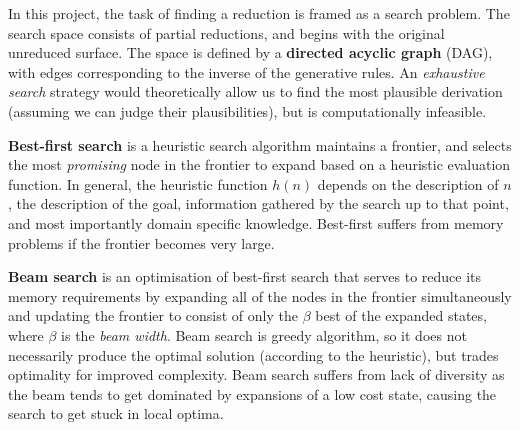 \documentclass[12pt,a4paper,twoside,openany]{report} \usepackage[pdfborder={0 0 0}]{hyperref}    %
\theoremstyle{definition} \newtheorem{definition}{Definition}[section]
\begin{document}
In this project, the task of finding a reduction is framed as a search problem.
The search space consists of partial reductions, and begins with the original unreduced surface. The space is defined by a \textbf{directed acyclic graph} (DAG), with edges corresponding to the inverse of the generative rules. 
An \textit{exhaustive search} strategy would theoretically allow us to find the most plausible derivation (assuming we
can judge their plausibilities), but is computationally infeasible.

\textbf{Best-first search} is a heuristic search algorithm maintains a frontier, and selects the most \textit{promising}
node in the frontier to expand based on a heuristic evaluation function. In general, the heuristic function $h(n)$ depends on  the description of $n$, the description of the goal, information gathered by the search up to that point, and most importantly domain specific
knowledge\cite{pearlHeuristicsIntelligentSearch1984}. 
Best-first suffers from memory problems if the frontier becomes very large.

\textbf{Beam search} is an optimisation of best-first search that serves to reduce its memory requirements by expanding
all of the nodes in the frontier simultaneously and
updating the frontier to consist of only the $\beta$ best of the expanded states, where $\beta$ is the \textit{beam
width}. Beam search is greedy algorithm, so it does not necessarily produce the optimal solution (according to the
heuristic), but trades optimality for improved complexity. Beam search suffers from lack of diversity as the beam tends to get dominated by expansions of a low cost state, causing the search to get stuck in local optima.

%
\end{document}
